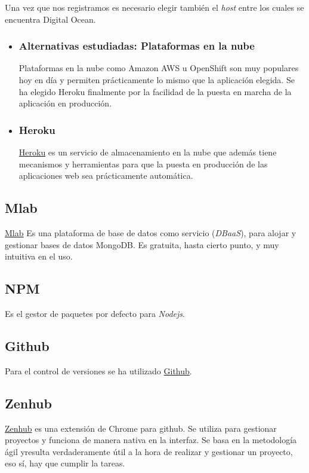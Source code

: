 Una vez que nos registramos es necesario elegir también el \emph{host} entre los cuales se encuentra Digital Ocean.

 \begin{itemize}
 	\item 	 \subsubsection{Alternativas estudiadas: Plataformas en la nube}\label{tnube}
  Plataformas en la nube como Amazon AWS u OpenShift son muy populares hoy en día y permiten prácticamente lo mismo que la aplicación elegida. Se ha elegido Heroku finalmente por la facilidad de la puesta en marcha de la aplicación en producción.
   \item    \subsubsection{Heroku}\label{otrasherramientas_heroku}
\href{https://www.heroku.com/}{Heroku}  es un servicio de almacenamiento en la nube que además tiene mecanismos y herramientas para que la puesta en producción de las aplicaciones web sea prácticamente automática.
\end{itemize}



  
 \subsection{Mlab}\label{otrasherramientas_mlab}
 \href{https://mlab.com/}{Mlab} Es una plataforma de base de datos como servicio (\emph{DBaaS}), para alojar y gestionar bases de datos MongoDB. Es gratuita, hasta cierto punto, y muy intuitiva en el uso.


 
  
   \subsection{NPM}\label{otrasherramientas_npm}
Es el gestor de paquetes por defecto para \emph{Nodejs}.
  
   \subsection{Github}\label{otrasherramientas_github}
   Para el control de versiones se ha utilizado \href{https://www.github.com/}{Github}. 
   
    \subsection{Zenhub}\label{otrasherramientas_zenhub}
    \href{https://www.zenhub.io/}{Zenhub} es una extensión de Chrome para github. Se utiliza para gestionar proyectos y funciona de manera nativa en la interfaz. Se basa en la metodología ágil yresulta verdaderamente útil a la hora de realizar y gestionar un proyecto, eso sí, hay que cumplir la tareas. 
    
